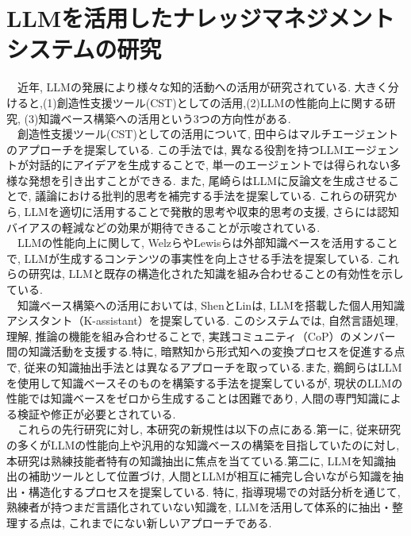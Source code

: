 \section{LLMを活用したナレッジマネジメントシステムの研究}
　近年, LLMの発展により様々な知的活動への活用が研究されている. 大きく分けると,(1)創造性支援ツール(CST)としての活用,(2)LLMの性能向上に関する研究, (3)知識ベース構築への活用という3つの方向性がある.\\

　創造性支援ツール(CST)としての活用について, 田中らはマルチエージェントのアプローチを提案している\cite{Tanaka2024}. この手法では, 異なる役割を持つLLMエージェントが対話的にアイデアを生成することで, 単一のエージェントでは得られない多様な発想を引き出すことができる. また, 尾崎らはLLMに反論文を生成させることで, 議論における批判的思考を補完する手法を提案している\cite{Ozaki2024}. これらの研究から, LLMを適切に活用することで発散的思考や収束的思考の支援, さらには認知バイアスの軽減などの効果が期待できることが示唆されている.\\

　LLMの性能向上に関して, WelzらやLewisらは外部知識ベースを活用することで, LLMが生成するコンテンツの事実性を向上させる手法を提案している\cite{Welz2024, Lewis2020}. これらの研究は, LLMと既存の構造化された知識を組み合わせることの有効性を示している.\\

　知識ベース構築への活用においては, ShenとLin\cite{Shen2024}は, LLMを搭載した個人用知識アシスタント（K-assistant）を提案している. このシステムでは, 自然言語処理, 理解, 推論の機能を組み合わせることで, 実践コミュニティ（CoP）のメンバー間の知識活動を支援する.特に, 暗黙知から形式知への変換プロセスを促進する点で, 従来の知識抽出手法とは異なるアプローチを取っている.また, 鵜飼らはLLMを使用して知識ベースそのものを構築する手法を提案している\cite{Ukai2023}が, 現状のLLMの性能では知識ベースをゼロから生成することは困難であり, 人間の専門知識による検証や修正が必要とされている.\\

　これらの先行研究に対し, 本研究の新規性は以下の点にある.第一に, 従来研究の多くがLLMの性能向上や汎用的な知識ベースの構築を目指していたのに対し, 本研究は熟練技能者特有の知識抽出に焦点を当てている.第二に, LLMを知識抽出の補助ツールとして位置づけ, 人間とLLMが相互に補完し合いながら知識を抽出・構造化するプロセスを提案している. 特に, 指導現場での対話分析を通じて, 熟練者が持つまだ言語化されていない知識を, LLMを活用して体系的に抽出・整理する点は, これまでにない新しいアプローチである. \\